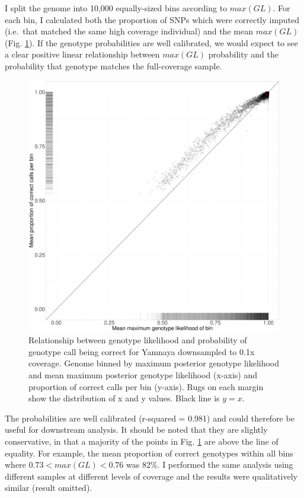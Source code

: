 I split the genome into 10,000 equally-sized bins according to $max(GL)$. For each bin, I calculated both the proportion of SNPs which were correctly imputed (i.e.\ that matched the same high coverage individual) and the mean $max(GL)$ (Fig. \ref{fig:Yamnaya_0.1x_GL_calibration}). If the genotype probabilities are well calibrated, we would expect to see a clear positive linear relationship between $max(GL)$ probability and the probability that genotype matches the full-coverage sample.

\begin{figure}[htp]
    \centering
    \includegraphics[width=1.0\textwidth]{../images/chapter1/Yamnaya_0.1x_bin.pdf}
    \caption{Relationship between genotype likelihood and probability of genotype call being correct for Yamnaya downsampled to 0.1x coverage. Genome binned by maximum posterior genotype likelihood and mean maximum posterior genotype likelihood (x-axis) and proportion of correct calls per bin (y-axis). Rugs on each margin show the distribution of x and y values. Black line is $y=x$.}
    \label{fig:Yamnaya_0.1x_GL_calibration}
\end{figure}

The probabilities are well calibrated (r-squared = 0.981) and could therefore be useful for downstream analysis. It should be noted that they are slightly conservative, in that a majority of the points in Fig. \ref{fig:Yamnaya_0.1x_GL_calibration} are above the line of equality. For example, the mean proportion of correct genotypes within all bins where $0.73 < max(GL) < 0.76$ was 82\%. I performed the same analysis using different samples at different levels of coverage and the results were qualitatively similar (result omitted).

